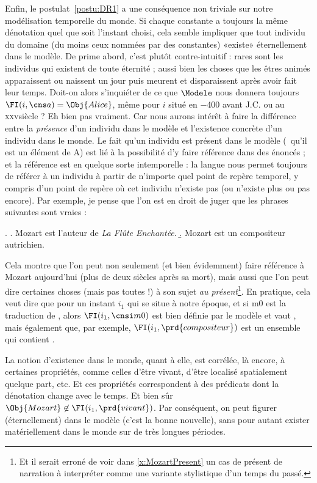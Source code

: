 Enfin, le postulat~\ref{postu:DR1} a une conséquence non triviale sur notre modélisation temporelle du monde. Si chaque constante a toujours la même dénotation quel que soit l'instant choisi, cela semble impliquer que tout individu du domaine (du moins ceux nommées par des constantes) «existe» éternellement dans le modèle.  De prime abord, c'est plutôt contre-intuitif : rares sont les individus qui existent de toute éternité ; aussi bien les choses que les êtres animés apparaissent ou naissent un jour puis meurent et disparaissent après avoir fait leur temps.
Doit-on alors s'inquiéter de ce que $\Modele$ nous donnera toujours $\FI(i,\cns a) = \Obj{Alice}$, même pour $i$ situé en $-$400 avant J.C. ou au \textsc{xxv}\ieme siècle ? Eh bien pas vraiment. 
Car nous aurons intérêt à faire la différence entre la \emph{présence} d'un individu dans le modèle et l'existence concrète d'un individu dans le monde. 
Le fait qu'un individu est présent dans le modèle (\ie\ qu'il est un élément de \Unv A) est lié à la possibilité d'y faire référence dans des énoncés ; et la référence est en quelque sorte intemporelle : la langue nous permet toujours de référer à un individu à partir de n'importe quel point de repère temporel, y compris d'un point de repère où cet individu n'existe pas (ou n'existe plus ou pas encore). Par exemple, je pense que l'on est en droit de juger que les phrases suivantes sont vraies :

\ex. \label{x:MozartPresent}
\a. Mozart est l'auteur de \emph{La Flûte Enchantée}.
\b. Mozart est un compositeur autrichien.

Cela montre que l'on peut non seulement (et bien évidemment) faire référence à Mozart aujourd'hui (plus de deux siècles après sa mort), mais aussi que l'on peut dire certaines choses (mais pas toutes !) à son sujet \emph{au présent}\footnote{Et il serait erroné de voir dans \ref{x:MozartPresent} un cas de présent de narration à interpréter comme une variante stylistique d'un temps du passé.}.  En pratique, cela veut dire que pour un instant $i_1$ qui se situe à notre époque, et si \cnsi m0 est la traduction de , alors $\FI(i_1,\cnsi m0)$ est bien définie par le modèle et vaut , mais également que, par exemple,  $\FI(i_1,\prd{compositeur})$ est un ensemble qui contient . 

\newpage

\sloppy 

La notion d'existence dans le monde, quant à elle, est corrélée, là encore, à certaines propriétés, comme celles d'être vivant, d'être localisé spatialement quelque part, etc.  Et ces propriétés correspondent à des prédicats dont la dénotation change avec le temps. Et bien sûr \(\Obj{Mozart}\not\in\FI(i_1,\prd{vivant})\).  Par conséquent, on peut figurer (éternellement) dans le modèle (c'est la bonne nouvelle), sans pour autant exister matériellement dans le monde sur de très longues périodes.

